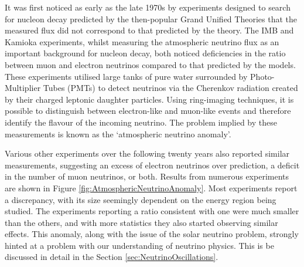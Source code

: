 It was first noticed as early as the late 1970s by experiments designed to search for nucleon decay predicted by the then-popular Grand Unified Theories that the measured flux did not correspond to that predicted by the theory.  The IMB \cite{Haines1986} and Kamioka \cite{Hirata1988} experiments, whilst measuring the atmospheric neutrino flux as an important background for nucleon decay, both noticed deficiencies in the ratio between muon and electron neutrinos compared to that predicted by the models.  These experiments utilised large tanks of pure water surrounded by Photo-Multiplier Tubes (PMTs) to detect neutrinos via the Cherenkov radiation created by their charged leptonic daughter particles.  Using ring-imaging techniques, it is possible to distinguish between electron-like and muon-like events and therefore identify the flavour of the incoming neutrino.  The problem implied by these measurements is known as the `atmospheric neutrino anomaly'.

Various other experiments over the following twenty years also reported similar measurements, suggesting an excess of electron neutrinos over prediction, a deficit in the number of muon neutrinos, or both.  Results from numerous experiments are shown in Figure \ref{fig:AtmosphericNeutrinoAnomaly}.  Most experiments report a discrepancy, with its size seemingly dependent on the energy region being studied.  The experiments reporting a ratio consistent with one were much smaller than the others, and with more statistics they also started observing similar effects.  This anomaly, along with the issue of the solar neutrino problem, strongly hinted at a problem with our understanding of neutrino physics.  This is be discussed in detail in the Section \ref{sec:NeutrinoOscillations}.

